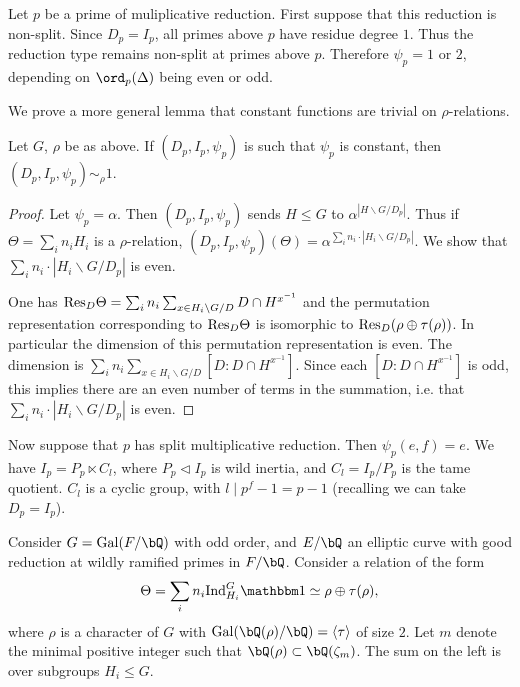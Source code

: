 Let $p$ be a prime of muliplicative reduction. First suppose that this reduction is non-split. Since $D_p = I_p$, all primes above $p$ have residue degree $1$. Thus the reduction type remains non-split at primes above $p$. Therefore $\psi_p = 1$ or $2$, depending on $\ord_p(\Delta)$ being even or odd. 

We prove a more general lemma that constant functions are trivial on $\rho$-relations.

\begin{lemma}
Let $G$, $\rho$ be as above. If $(D_p, I_p, \psi_p)$ is such that $\psi_p$ is constant, then $(D_p, I_p, \psi_p) \sim_{\rho} 1$.  
\end{lemma}   

\begin{proof}
    Let $\psi_p = \alpha$. Then $(D_p, I_p, \psi_p)$ sends $H \leq G$ to $\alpha^{| H \backslash G / D_p|}$. Thus if $\Theta = \sum_i n_i H_i$ is a $\rho$-relation, $(D_p, I_p, \psi_p)(\Theta) = \alpha^{ \sum_i n_i \cdot | H_i \backslash G / D_p|}$. We show that $\sum_i n_i \cdot | H_i \backslash G / D_p|$ is even. 

    One has $\mathrm{Res}_D \Theta = \sum_i n_i \sum_{x \in H_i \backslash G / D} D \cap H^{x^{-1}}$ and the permutation representation corresponding to $\mathrm{Res}_D \Theta$ is isomorphic to $\mathrm{Res}_D (\rho \oplus \tau(\rho))$. In particular the dimension of this permutation representation is even. The dimension is $\sum_i n_i \sum_{x \in H_i \backslash G / D} [D \colon D \cap H^{x^{-1}} ]$. Since each $[D \colon D \cap H^{x^{-1}} ]$ is odd, this implies there are an even number of terms in the summation, i.e. that $\sum_i n_i \cdot | H_i \backslash G / D_p|$ is even. 
    
\end{proof}

Now suppose that $p$ has split multiplicative reduction. Then $\psi_p(e, f) = e$. We have $I_p = P_p \ltimes C_l$, where $P_p \triangleleft I_p$ is wild inertia, and $C_l = I_p / P_p$ is the tame quotient. $C_l$ is a cyclic group, with $l \mid p^f - 1 = p - 1$ (recalling we can take $D_p = I_p$).


Consider $G = \Gal(F / \bQ)$ with odd order, and $E / \bQ$ an elliptic curve with good reduction at wildly ramified primes in $F / \bQ$. Consider a relation of the form
\begin{equation}\label{reln} 
    \Theta = \sum_i n_i \Ind_{H_i}^G \trivial \simeq \rho \oplus \tau(\rho),
\end{equation}
where $\rho$ is a character of $G$ with $\Gal(\bQ(\rho) / \bQ) = \langle \tau \rangle $ of size $2$. Let $m$ denote the minimal positive integer such that $\bQ(\rho) \subset \bQ(\zeta_m)$. The sum on the left is over subgroups $H_i \leq G$. 

